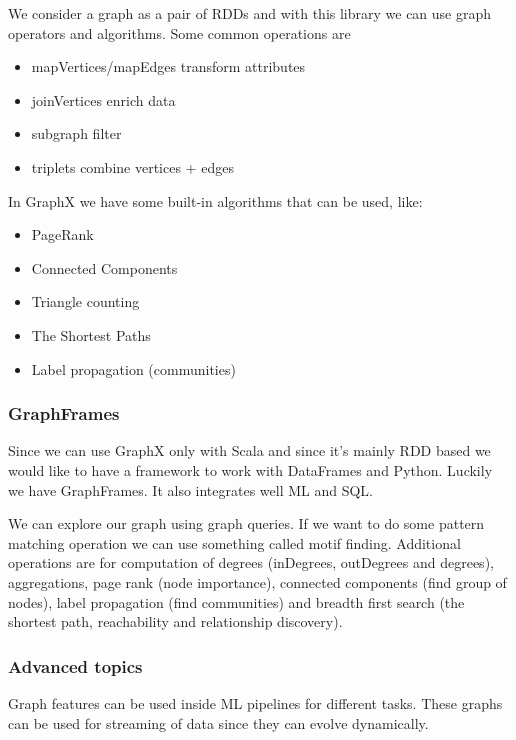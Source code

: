 We consider a graph as a pair of RDDs and with this library we can use graph operators and algorithms. Some common operations are

\begin{itemize}
    \item mapVertices/mapEdges \ra transform attributes
    \item joinVertices \ra enrich data
    \item subgraph \ra filter
    \item triplets \ra combine vertices + edges
\end{itemize}

In GraphX we have some built-in algorithms that can be used, like:
\begin{itemize}
    \item PageRank
    \item Connected Components
    \item Triangle counting
    \item The Shortest Paths
    \item Label propagation (communities)
\end{itemize}

\subsubsection{GraphFrames}

Since we can use GraphX only with Scala and since it's mainly RDD based we would like to have a framework to work with DataFrames and Python. Luckily we have GraphFrames. It also integrates well ML and SQL. 

\vspace{10pt}

We can explore our graph using graph queries. If we want to do some pattern matching operation we can use something called motif finding. Additional operations are for computation of degrees (inDegrees, outDegrees and degrees), aggregations, page rank (node importance), connected components (find group of nodes), label propagation (find communities) and breadth first search (the shortest path, reachability and relationship discovery). 


\subsubsection{Advanced topics}

Graph features can be used inside ML pipelines for different tasks. These graphs can be used for streaming of data since they can evolve dynamically. 

